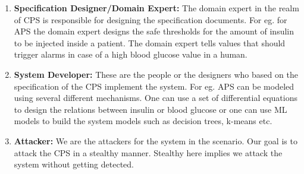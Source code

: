 \begin{enumerate}
	\item \textbf{Specification Designer/Domain Expert:} The domain expert in the realm of \ac{CPS} is responsible for designing the specification documents. For eg. for \ac{APS} the domain expert designs the safe thresholds for the amount of insulin to be injected inside a patient. The domain expert tells values that should trigger alarms in case of a high blood glucose value in a human. 
	
	\item \textbf{System Developer:} These are the people or the designers who based on the specification of the CPS implement the system. For eg. \ac{APS} can be modeled using several different mechanisms. One can use a set of differential equations to design the relations between insulin or blood glucose or one can use \ac{ML} models to build the system models such as decision trees, k-means etc. 
	
	\item \textbf{Attacker:} We are the attackers for the system in the scenario. Our goal is to attack the \ac{CPS} in a stealthy manner. Stealthy here implies we attack the system without getting detected. 
\end{enumerate}
